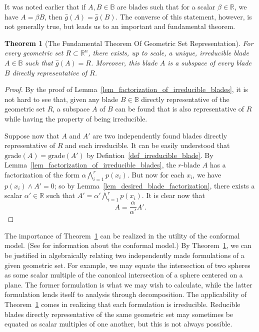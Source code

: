 \documentclass{birkjour}
\newtheorem{thm}{Theorem}[section]
\theoremstyle{definition}
\theoremstyle{remark}
\numberwithin{equation}{section}
\newcommand{\R}{\mathbb{R}}
\newcommand{\B}{\mathbb{B}}
\newcommand{\gh}{\hat{g}}
\newcommand{\grade}{\mbox{grade}}
\begin{document}
It was noted earlier that if $A,B\in\B$ are blades such that for a scalar $\beta\in\R$,
we have $A=\beta B$, then $\gh(A)=\gh(B)$.  The converse of this statement, however,
is not generally true, but leads us to an important and fundamental theorem.

\begin{thm}[The Fundamental Theorem Of Geometric Set Representation]\label{thm_geo_set_rep}
For every geometric set $R\subset\R^n$, there exists, up to scale, a unique,
irreducible blade $A\in\B$ such that $\gh(A)=R$.  Moreover, this blade $A$ is a
subspace of every blade $B$ directly representative of $R$.
\end{thm}
\begin{proof}
By the proof of Lemma~\ref{lem_factorization_of_irreducible_blades}, it is not hard to see that, given any blade $B\in\B$ directly
representative of the geometric set $R$, a subspace $A$ of $B$ can be found that is
also representative of $R$ while having the property of being irreducible.

Suppose now that $A$ and $A'$ are two independently found blades directly representative of $R$
and each irreducible.  It can be easily understood that $\grade(A)=\grade(A')$ by Defintion~\ref{def_irreducible_blade}.
By Lemma~\ref{lem_factorization_of_irreducible_blades}, the $r$-blade $A$ has a factorization
of the form $\alpha\bigwedge_{i=1}^r p(x_i)$.  But now for each $x_i$, we have $p(x_i)\wedge A'=0$; so by
Lemma~\ref{lem_desired_blade_factorization}, there exists a scalar $\alpha'\in\R$ such that $A'=\alpha'\bigwedge_{i=1}^r p(x_i)$.
It is clear now that
\begin{equation}
A = \frac{\alpha}{\alpha'}A'.
\end{equation}
\end{proof}

The importance of Theorem~\ref{thm_geo_set_rep} can be realized
in the utility of the conformal model.  (See \cite{} for information about the conformal model.)
By Theorem~\ref{thm_geo_set_rep}, we can be justified in algebraically
relating two independently made formulations
of a given geometric set.  For example, we may equate the intersection of two spheres as some
scalar multiple of the canonical intersection of a sphere centered on a plane.  The former formulation
is what we may wish to calculate, while the latter formulation lends itself to analysis through decomposition.
The applicability of Theorem~\ref{thm_geo_set_rep} comes in realizing that each formulation is irreducible.
Reducible blades directly representative of the same geometric set may sometimes be equated as scalar multiples
of one another, but this is not always possible.
\end{document}

